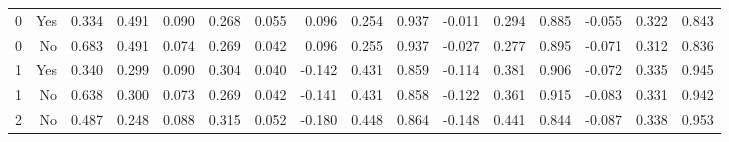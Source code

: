 \begin{tabular}{*{16}{r}}
0 & Yes & 0.334 & 0.491 & 0.090 & 0.268 & 0.055 & 0.096 & 0.254 & 0.937 & -0.011 & 0.294 & 0.885 & -0.055 & 0.322 & 0.843 \\ 
0 & No & 0.683 & 0.491 & 0.074 & 0.269 & 0.042 & 0.096 & 0.255 & 0.937 & -0.027 & 0.277 & 0.895 & -0.071 & 0.312 & 0.836 \\ 
1 & Yes & 0.340 & 0.299 & 0.090 & 0.304 & 0.040 & -0.142 & 0.431 & 0.859 & -0.114 & 0.381 & 0.906 & -0.072 & 0.335 & 0.945 \\ 
1 & No & 0.638 & 0.300 & 0.073 & 0.269 & 0.042 & -0.141 & 0.431 & 0.858 & -0.122 & 0.361 & 0.915 & -0.083 & 0.331 & 0.942 \\ 
2 & No & 0.487 & 0.248 & 0.088 & 0.315 & 0.052 & -0.180 & 0.448 & 0.864 & -0.148 & 0.441 & 0.844 & -0.087 & 0.338 & 0.953 \\ 
\bottomrule 
 \end{tabular}